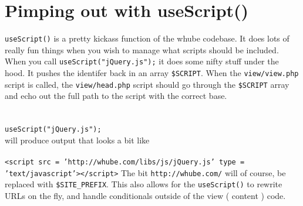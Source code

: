 \section{Pimping out with useScript()}
\texttt{useScript()} is a pretty kickass function of the whube codebase.
It does lots of really fun things when you wish to manage what scripts should be included.
When you call \texttt{useScript("jQuery.js");} it does some nifty stuff under the hood.
It pushes the identifer back in an array \texttt{\$SCRIPT}. When the \texttt{view/view.php}
script is called, the \texttt{view/head.php} script should go through the \texttt{\$SCRIPT}
array and echo out the full path to the script with the correct base.\\
\\
\\
\texttt{useScript("jQuery.js");} \\ will produce output that looks a bit like \\
\\
\texttt{<script src = 'http://whube.com/libs/js/jQuery.js' type = 'text/javascript'></script>}
The bit \texttt{http://whube.com/} will of course, be replaced with \texttt{\$SITE\_PREFIX}.
This also allows for the \texttt{useScript()} to rewrite URLs on the fly, and handle conditionals
outside of the view ( content ) code.
